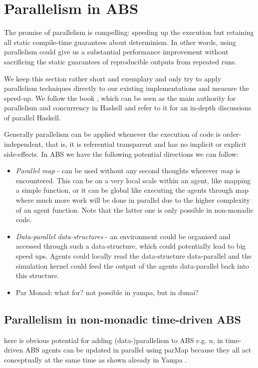 \section{Parallelism in ABS}
The promise of parallelism is compelling: speeding up the execution but retaining all static compile-time guarantees about determinism. In other words, using parallelism could give us a substantial performance improvement without sacrificing the static guarantees of reproducible outputs from repeated runs.

We keep this section rather short and exemplary and only try to apply parallelism techniques directly to our existing implementations and measure the speed-up. We follow the book \cite{marlow_parallel_2013}, which can be seen as the main authority for parallelism and concurrency in Haskell and refer to it for an in-depth discussions of parallel Haskell.

Generally parallelism can be applied whenever the execution of code is order-independent, that is, it is referential transparent and has no implicit or explicit side-effects. In ABS we have the following potential directions we can follow:

\begin{itemize}
	\item \textit{Parallel map} - can be used without any second thoughts wherever \textit{map} is encountered. This can be on a very local scale within an agent, like mapping a simple function, or it can be global like executing the agents through map where much more work will be done in parallel due to the higher complexity of an agent function. Note that the latter one is only possible in non-monadic code.
	
	\item \textit{Data-parallel data-structures} - an environment could be organised and accessed through such a data-structure, which could potentially lead to big speed ups. Agents could locally read the data-structure data-parallel and the simulation kernel could feed the output of the agents data-parallel back into this structure.
	
	\item Par Monad: what for? not possible in yampa, but in dunai?
\end{itemize}

\subsection{Parallelism in non-monadic time-driven ABS}
here is obvious potential for adding (data-)parallelism to ABS e.g. u, in time-driven ABS agents can be updated in parallel using parMap because they all act conceptually at the same time as shown already in Yampa \cite{perez_60_2014}.

